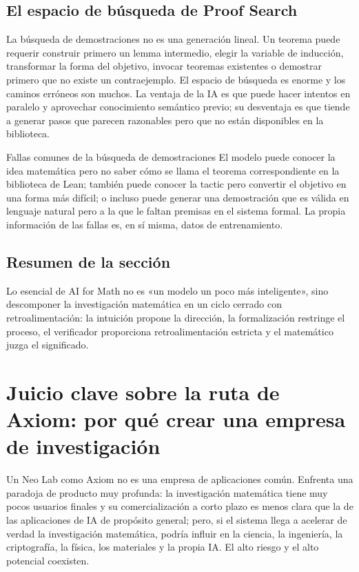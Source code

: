 \documentclass[a4paper]{article}
\begin{document}
\subsection{El espacio de búsqueda de Proof Search}

La búsqueda de demostraciones no es una generación lineal. Un teorema puede requerir construir primero un lemma intermedio, elegir la variable de inducción, transformar la forma del objetivo, invocar teoremas existentes o demostrar primero que no existe un contraejemplo. El espacio de búsqueda es enorme y los caminos erróneos son muchos. La ventaja de la IA es que puede hacer intentos en paralelo y aprovechar conocimiento semántico previo; su desventaja es que tiende a generar pasos que parecen razonables pero que no están disponibles en la biblioteca.

\begin{warningbox}{Fallas comunes de la búsqueda de demostraciones}
El modelo puede conocer la idea matemática pero no saber cómo se llama el teorema correspondiente en la biblioteca de Lean; también puede conocer la tactic pero convertir el objetivo en una forma más difícil; o incluso puede generar una demostración que es válida en lenguaje natural pero a la que le faltan premisas en el sistema formal. La propia información de las fallas es, en sí misma, datos de entrenamiento.
\end{warningbox}

\subsection{Resumen de la sección}

Lo esencial de AI for Math no es «un modelo un poco más inteligente», sino descomponer la investigación matemática en un ciclo cerrado con retroalimentación: la intuición propone la dirección, la formalización restringe el proceso, el verificador proporciona retroalimentación estricta y el matemático juzga el significado.
\section{Juicio clave sobre la ruta de Axiom: por qué crear una empresa de investigación}

Un Neo Lab como Axiom no es una empresa de aplicaciones común. Enfrenta una paradoja de producto muy profunda: la investigación matemática tiene muy pocos usuarios finales y su comercialización a corto plazo es menos clara que la de las aplicaciones de IA de propósito general; pero, si el sistema llega a acelerar de verdad la investigación matemática, podría influir en la ciencia, la ingeniería, la criptografía, la física, los materiales y la propia IA. El alto riesgo y el alto potencial coexisten.
\end{document}
